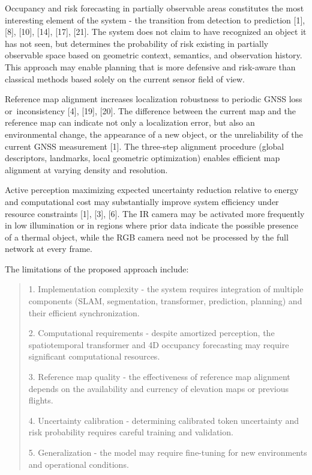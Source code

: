 \documentclass[
]{article}
\begin{document}
Occupancy and risk forecasting in partially observable areas constitutes
the most interesting element of the system - the transition from
detection to prediction {[}1{]}, {[}8{]}, {[}10{]}, {[}14{]}, {[}17{]},
{[}21{]}. The system does not claim to have recognized an object it has
not seen, but determines the probability of risk existing in partially
observable space based on geometric context, semantics, and observation
history. This approach may enable planning that is more defensive and
risk-aware than classical methods based solely on the current sensor
field of view.

Reference map alignment increases localization robustness to periodic
GNSS loss or~inconsistency {[}4{]}, {[}19{]}, {[}20{]}. The difference
between the current map and the reference map can indicate not only a
localization error, but also an environmental change, the appearance of
a new object, or the unreliability of the current GNSS measurement
{[}1{]}. The three-step alignment procedure (global descriptors,
landmarks, local geometric optimization) enables efficient map alignment
at varying density and resolution.

Active perception maximizing expected uncertainty reduction relative to
energy and computational cost may substantially improve system
efficiency under resource constraints {[}1{]}, {[}3{]}, {[}6{]}. The IR
camera may be activated more frequently in low illumination or in
regions where prior data indicate the possible presence of a thermal
object, while the RGB camera need not be processed by the full network
at every frame.

The limitations of the proposed approach include:

\begin{quote}
1. Implementation complexity - the system requires integration of
multiple components (SLAM, segmentation, transformer, prediction,
planning) and their efficient synchronization.

2. Computational requirements - despite amortized perception, the
spatiotemporal transformer and 4D occupancy forecasting may require
significant computational resources.

3. Reference map quality - the effectiveness of reference map alignment
depends on the availability and currency of elevation maps or previous
flights.

4. Uncertainty calibration - determining calibrated token uncertainty
and risk probability requires careful training and validation.

5. Generalization - the model may require fine-tuning for new
environments and operational conditions.
\end{quote}
\end{document}
